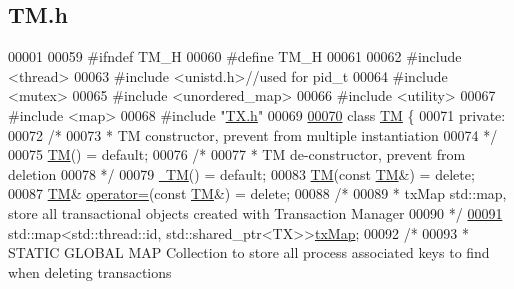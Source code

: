 \hypertarget{_t_m_8h_source}{}\subsection{T\+M.\+h}

\begin{DoxyCode}
00001 
00059 \textcolor{preprocessor}{#ifndef TM\_H}
00060 \textcolor{preprocessor}{#define TM\_H}
00061 
00062 \textcolor{preprocessor}{#include <thread>}
00063 \textcolor{preprocessor}{#include <unistd.h>}\textcolor{comment}{//used for pid\_t}
00064 \textcolor{preprocessor}{#include <mutex>}
00065 \textcolor{preprocessor}{#include <unordered\_map>}
00066 \textcolor{preprocessor}{#include <utility>}
00067 \textcolor{preprocessor}{#include <map>}
00068 \textcolor{preprocessor}{#include "\hyperlink{_t_x_8h}{TX.h}"}
00069 
\hypertarget{_t_m_8h_source.tex_l00070}{}\hyperlink{class_t_m}{00070} \textcolor{keyword}{class }\hyperlink{class_t_m}{TM} \{
00071 \textcolor{keyword}{private}:
00072     \textcolor{comment}{/*}
00073 \textcolor{comment}{     * TM constructor, prevent from multiple instantiation}
00074 \textcolor{comment}{     */}
00075     \hyperlink{class_t_m_a9b5afb6b9d7c5925ab5cc5c65078ac23_a9b5afb6b9d7c5925ab5cc5c65078ac23}{TM}() = \textcolor{keywordflow}{default}; 
00076     \textcolor{comment}{/*}
00077 \textcolor{comment}{     * TM de-constructor, prevent from deletion}
00078 \textcolor{comment}{     */}
00079     \hyperlink{class_t_m_a985f8cb24f685925ddd637c7030cd2b3_a985f8cb24f685925ddd637c7030cd2b3}{~TM}() = \textcolor{keywordflow}{default};
00083     \hyperlink{class_t_m_a9b5afb6b9d7c5925ab5cc5c65078ac23_a9b5afb6b9d7c5925ab5cc5c65078ac23}{TM}(\textcolor{keyword}{const} \hyperlink{class_t_m}{TM}&) = \textcolor{keyword}{delete}; 
00087     \hyperlink{class_t_m}{TM}& \hyperlink{class_t_m_a85a6b783f0566f0877bab6a7de977c0a_a85a6b783f0566f0877bab6a7de977c0a}{operator=}(\textcolor{keyword}{const} \hyperlink{class_t_m}{TM}&) = \textcolor{keyword}{delete}; 
00088     \textcolor{comment}{/*}
00089 \textcolor{comment}{     * txMap std::map, store all transactional objects created with Transaction Manager}
00090 \textcolor{comment}{     */}
\hypertarget{_t_m_8h_source.tex_l00091}{}\hyperlink{class_t_m_a0333dfa193ea99d7626de74a2b932e9b_a0333dfa193ea99d7626de74a2b932e9b}{00091}     std::map<std::thread::id, std::shared\_ptr<TX>>\hyperlink{class_t_m_a0333dfa193ea99d7626de74a2b932e9b_a0333dfa193ea99d7626de74a2b932e9b}{txMap};
00092     \textcolor{comment}{/*}
00093 \textcolor{comment}{     * STATIC GLOBAL MAP Collection to store all process associated keys to find when deleting transactions
}
\end{DoxyCode}
